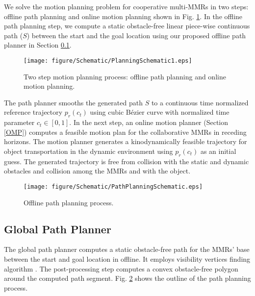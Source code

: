 We solve the motion planning problem for cooperative multi-MMRs in two steps: offline path planning and online motion planning shown in Fig. \ref{fig2}. In the offline path planning step, we compute a static obstacle-free linear piece-wise continuous path ($S$) between the start and the goal location using our proposed offline path planner in Section \ref{GPP}.

\begin{figure}[htbp]
	\centerline{\texttt{[image: figure/Schematic/PlanningSchematic1.eps]}}
	\caption{Two step motion planning process: offline path planning and online motion planning.}
	\label{fig2}
\end{figure}

The path planner smooths the generated path $S$ to a continuous time normalized reference trajectory $p_r(c_t)$ using cubic Bézier curve with normalized time parameter $c_t \in [0,1]$. 
In the next step, an online motion planner (Section \ref{OMP}) computes a feasible motion plan for the collaborative MMRs in receding horizons. The motion planner generates a kinodynamically feasible trajectory for object transportation in the dynamic environment using $p_r(c_t)$ as an initial guess. The generated trajectory is free from collision with the static and dynamic obstacles and collision among the MMRs and with the object.

\begin{figure}[htbp]
	\centerline{\texttt{[image: figure/Schematic/PathPlanningSchematic.eps]}}
	\caption{Offline path planning process.}
	\label{fig:3}
\end{figure}

\subsection{Global Path Planner}\label{GPP}
The global path planner computes a static obstacle-free path for the MMRs' base between the start and goal location in offline. It employs visibility vertices finding algorithm \cite{2005_Choset}. The post-processing step computes a convex obstacle-free polygon around the computed path segment. Fig. \ref{fig:3} shows the outline of the path planning process.

